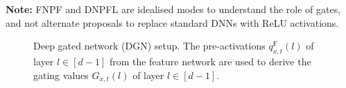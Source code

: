 \textbf{Note:} FNPF and DNPFL are idealised modes to understand the role of gates, and not alternate proposals to replace standard DNNs with ReLU activations. 
\begin{figure}[h] 
\begin{minipage}{0.70\columnwidth}
\end{minipage}
\begin{minipage}{0.29\columnwidth}
\end{minipage}
\caption{Deep gated network (DGN) setup.  The pre-activations $q^{\text{F}}_{x,t}(l)$ of layer $l\in[d-1]$ from the feature network are used to derive the gating values $G_{x,t}(l)$ of layer $l\in[d-1]$. }
\label{fig:dgn}
\end{figure}
